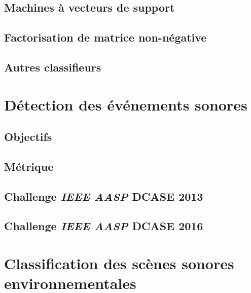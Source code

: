 \subsection{Machines à vecteurs de support}
\label{sec:ch6_svm}

\subsection{Factorisation de matrice non-négative}
\label{sec:ch6_nmf}

\subsection{Autres classifieurs}
\label{sec:ch6_autresAlgo}


\section{Détection des événements sonores}
\label{sec:ch6_AED}

\subsection{Objectifs}
\label{sec:ch6_objAED}


\subsection{Métrique}
\label{sec:ch6_metriqueAED}


\subsection{Challenge \emph{IEEE AASP} DCASE 2013}
\label{sec:ch6_dcase2013AED}

\subsection{Challenge \emph{IEEE AASP} DCASE 2016}
\label{sec:ch6_dcase2016AED}

\section{Classification des scènes sonores environnementales}
\label{sec:ch6_ASC}

